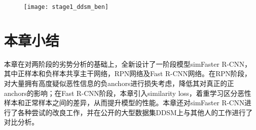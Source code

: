 	\begin{figure}[!htbp]
    \centering
    \texttt{[image: stage1\_ddsm\_ben]}
    \label{fig:stage1_ddsm_vis_neg}
	\end{figure}

\section{本章小结}
本章在对两阶段的劣势分析的基础上，全新设计了一阶段模型simFaster R-CNN，其中正样本和负样本共享主干网络，RPN网络及Fast R-CNN网络。在RPN阶段，对大量拥有高度疑似恶性信息的负anchors进行损失考虑，降低其对真正的正anchors的影响；在Fast R-CNN阶段，本章引入similarity loss，着重学习区分恶性样本和正常样本之间的差异，从而提升模型的性能。本章还对simFaster R-CNN进行了各种尝试的改良工作，并在公开的大型数据集DDSM上与其他人的工作进行了对比分析。